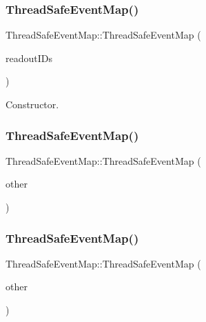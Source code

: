 \subsubsection{\texorpdfstring{Thread\+Safe\+Event\+Map()}{ThreadSafeEventMap()}\hspace{0.1cm}{\footnotesize\ttfamily [1/3]}}
{\footnotesize\ttfamily Thread\+Safe\+Event\+Map\+::\+Thread\+Safe\+Event\+Map (\begin{DoxyParamCaption}\item[{const std\+::list$<$ \hyperlink{class_readout_identifier}{Readout\+Identifier} $>$}]{readout\+I\+Ds }\end{DoxyParamCaption})}



Constructor. 

\mbox{\label{class_thread_safe_event_map_a523d5bf6c632e3803e721ef3fd94e318}} 
\subsubsection{\texorpdfstring{Thread\+Safe\+Event\+Map()}{ThreadSafeEventMap()}\hspace{0.1cm}{\footnotesize\ttfamily [2/3]}}
{\footnotesize\ttfamily Thread\+Safe\+Event\+Map\+::\+Thread\+Safe\+Event\+Map (\begin{DoxyParamCaption}\item[{const \hyperlink{class_thread_safe_event_map}{Thread\+Safe\+Event\+Map} \&}]{other }\end{DoxyParamCaption})\hspace{0.3cm}{\ttfamily [delete]}}

\mbox{\label{class_thread_safe_event_map_af28959f5fbd84f00d227d10e1b37e5e5}} 
\subsubsection{\texorpdfstring{Thread\+Safe\+Event\+Map()}{ThreadSafeEventMap()}\hspace{0.1cm}{\footnotesize\ttfamily [3/3]}}
{\footnotesize\ttfamily Thread\+Safe\+Event\+Map\+::\+Thread\+Safe\+Event\+Map (\begin{DoxyParamCaption}\item[{const \hyperlink{class_thread_safe_event_map}{Thread\+Safe\+Event\+Map} \&\&}]{other }\end{DoxyParamCaption})\hspace{0.3cm}{\ttfamily [delete]}}



